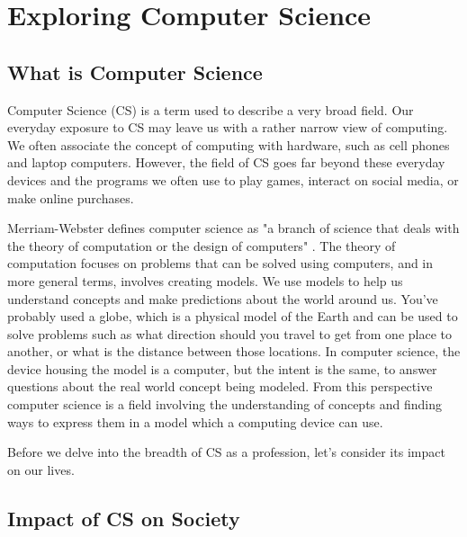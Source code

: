 
\chapter{Exploring Computer Science}

\section{What is Computer Science}

Computer Science (CS) is a term used to describe a very broad field. Our everyday exposure to CS may leave us with a rather narrow view of computing. We often associate the concept of computing with hardware, such as cell phones and laptop computers. However, the field of CS goes far beyond these everyday devices and the programs we often use to play games, interact on social media, or make online purchases.

Merriam-Webster defines computer science as "a branch of science that deals with the theory of computation or the design of computers" \parencite{noauthor_computer_nodate}. The theory of computation focuses on problems that can be solved using computers, and in more general terms, involves creating models. We use models to help us understand concepts and make predictions about the world around us. You've probably used a globe, which is a physical model of the Earth and can be used to solve problems such as what direction should you travel to get from one place to another, or what is the distance between those locations. In computer science, the device housing the model is a computer, but the intent is the same, to answer questions about the real world concept being modeled. From this perspective computer science is a field involving the understanding of concepts and finding ways to express them in a model which a computing device can use.

Before we delve into the breadth of CS as a profession, let's consider its impact on our lives.


\section{Impact of CS on Society}


